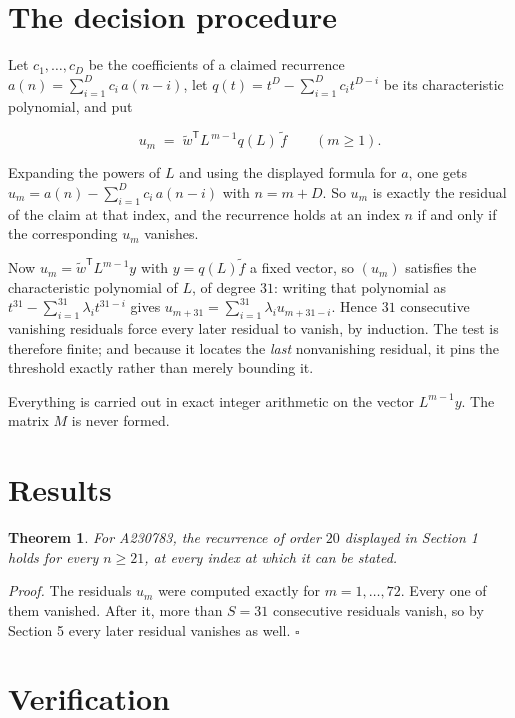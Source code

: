 \documentclass[11pt]{article}
\newtheorem{theorem}{Theorem}
\theoremstyle{definition}
\begin{document}
\section{The decision procedure}

Let $c_1,\dots,c_D$ be the coefficients of a claimed recurrence $a(n) = \sum_{i=1}^{D} c_i\,a(n-i)$, let $q(t) = t^{D} - \sum_{i=1}^{D} c_i t^{D-i}$ be its characteristic polynomial, and put

\[u_m \;=\; \tilde w^{\mathsf T} L^{\,m-1} q(L)\,\tilde f \qquad (m \ge 1).\]

Expanding the powers of $L$ and using the displayed formula for $a$, one gets $u_m = a(n) - \sum_{i=1}^{D} c_i\,a(n-i)$ with $n = m + D$. So $u_m$ is exactly the residual of the claim at that index, and the recurrence holds at an index $n$ if and only if the corresponding $u_m$ vanishes.

Now $u_m = \tilde w^{\mathsf T} L^{m-1} y$ with $y = q(L)\tilde f$ a fixed vector, so $(u_m)$ satisfies the characteristic polynomial of $L$, of degree $31$: writing that polynomial as $t^{31} - \sum_{i=1}^{31} \lambda_i t^{31-i}$ gives $u_{m+31} = \sum_{i=1}^{31} \lambda_i u_{m+31-i}$. Hence $31$ consecutive vanishing residuals force every later residual to vanish, by induction. The test is therefore finite; and because it locates the {\itshape last} nonvanishing residual, it pins the threshold exactly rather than merely bounding it.

Everything is carried out in exact integer arithmetic on the vector $L^{m-1}y$. The matrix $M$ is never formed.

\section{Results}

\begin{theorem} For A230783, the recurrence of order $20$ displayed in Section 1 holds for every $n \ge 21$, at every index at which it can be stated.\end{theorem}

{\itshape Proof.} The residuals $u_m$ were computed exactly for $m = 1,\dots,72$. Every one of them vanished. After it, more than $S = 31$ consecutive residuals vanish, so by Section 5 every later residual vanishes as well. $\square$

\section{Verification}
\end{document}
